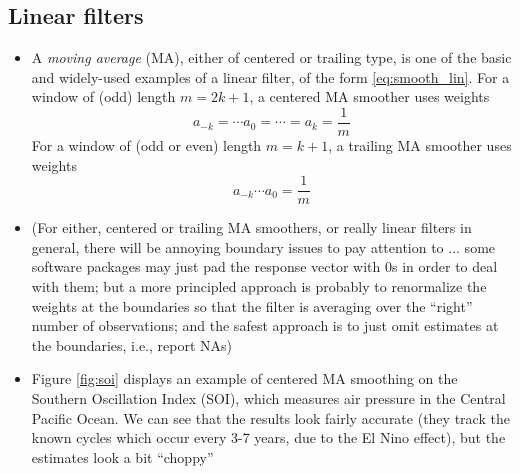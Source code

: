 \documentclass{article}
\begin{document}
\subsection{Linear filters}

\begin{itemize}
\item A \emph{moving average} (MA), either of centered or trailing type, is one
  of the basic and widely-used examples of a linear filter, of the form 
  \eqref{eq:smooth_lin}. For a window of (odd) length $m = 2k+1$, a centered MA
  smoother uses weights 
  \[
  a_{-k} = \cdots a_0 = \cdots = a_k = \frac{1}{m}
  \]
  For a window of (odd or even) length $m = k+1$, a trailing MA smoother uses
  weights 
  \[
  a_{-k} \cdots a_0 = \frac{1}{m}
  \]

\item (For either, centered or trailing MA smoothers, or really linear filters
  in general, there will be annoying boundary issues to pay attention to
  ... some software packages may just pad the response vector with 0s in order
  to deal with them; but a more principled approach is probably to renormalize
  the weights at the boundaries so that the filter is averaging over the
  ``right'' number of observations; and the safest approach is to just omit 
  estimates at the boundaries, i.e., report NAs)

\item Figure \ref{fig:soi} displays an example of centered MA smoothing on the 
  Southern Oscillation Index (SOI), which measures air pressure in the Central 
  Pacific Ocean. We can see that the results look fairly accurate (they track
  the known cycles which occur every 3-7 years, due to the El Nino effect), but
  the estimates look a bit ``choppy''    


\end{itemize}
\end{document}
